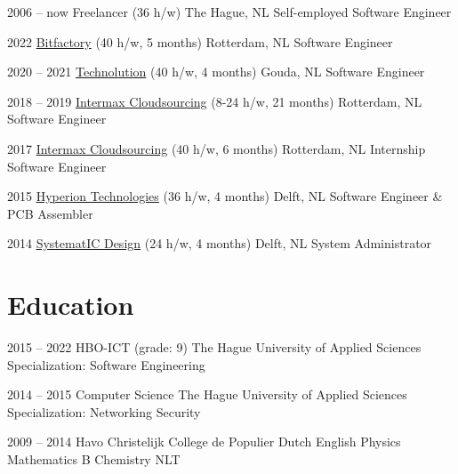 \documentclass[]{cv-timvisee}
\begin{document}
\begin{entrylist}

\entry
{2006 -- now}
{Freelancer {\footnotesize\normalfont (36 h/w)}}
{The Hague, NL}
{Self-employed Software Engineer}

\entry
{2022}
{\href{https://bitfactory.nl/}{Bitfactory} {\footnotesize\normalfont (40 h/w, 5 months)}}
{Rotterdam, NL}
{Software Engineer}

\entry
{2020 -- 2021}
{\href{https://technolution.eu/}{Technolution} {\footnotesize\normalfont (40 h/w, 4 months)}}
{Gouda, NL}
{Software Engineer}

\entry
{2018 -- 2019}
{\href{https://intermax.nl/}{Intermax Cloudsourcing} {\footnotesize\normalfont (8-24 h/w, 21 months)}}
{Rotterdam, NL}
{Software Engineer}

\entry
{2017}
{\href{https://intermax.nl/}{Intermax Cloudsourcing} {\footnotesize\normalfont (40 h/w, 6 months)}}
{Rotterdam, NL}
{Internship Software Engineer}

\entry
{2015}
{\href{https://hyperiontechnologies.nl/}{Hyperion Technologies} {\footnotesize\normalfont (36 h/w, 4 months)}}
{Delft, NL}
{Software Engineer \& PCB Assembler}

\entry
{2014}
{\href{https://systemat-ic.com/}{SystematIC Design} {\footnotesize\normalfont (24 h/w, 4 months)}}
{Delft, NL}
{System Administrator}

\end{entrylist}


\section{Education}

\begin{entrylist}

\entry
{2015 -- 2022}
{HBO-ICT {\footnotesize\normalfont (grade: 9)}}
{The Hague University of Applied Sciences}
{Specialization: Software Engineering}

\entry
{2014 -- 2015}
{Computer Science}
{The Hague University of Applied Sciences}
{Specialization: Networking \textperiodcentered{} Security}

\entry
{2009 -- 2014}
{Havo}
{Christelijk College de Populier}
{Dutch \textperiodcentered{} English \textperiodcentered{} Physics \textperiodcentered{} Mathematics B \textperiodcentered{} Chemistry \textperiodcentered{} NLT}

\end{entrylist}
\end{document}
